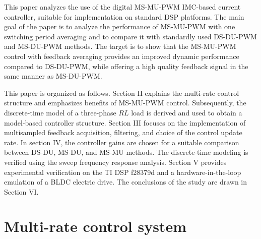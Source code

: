 \documentclass[conference]{IEEEtran}
\begin{document}
This paper analyzes the use of the digital MS-MU-PWM IMC-based current controller, suitable for implementation on standard DSP platforms. The main goal of the paper is to analyze the performance of MS-MU-PWM with one switching period averaging and to compare it with standardly used DS-DU-PWM and MS-DU-PWM methods. 
The target is to show that the MS-MU-PWM control with feedback averaging provides an improved dynamic performance compared to DS-DU-PWM, while offering a high quality feedback signal in the same manner as MS-DU-PWM.

This paper is organized as follows. Section II explains the multi-rate control structure and emphasizes benefits of MS-MU-PWM control. Subsequently, the discrete-time model of a three-phase $RL$ load is derived and used to obtain a model-based controller structure. Section III focuses on the implementation of multisampled feedback acquisition, filtering, and choice of the control update rate. In section IV, the controller gains are chosen for a suitable comparison between DS-DU, MS-DU, and MS-MU methods. The discrete-time modeling is verified using the sweep frequency response analysis. Section V provides experimental verification on the TI DSP f28379d and a hardware-in-the-loop emulation of a BLDC electric drive. The conclusions of the study are drawn in Section VI.
 
\section{Multi-rate control system}
\end{document}
